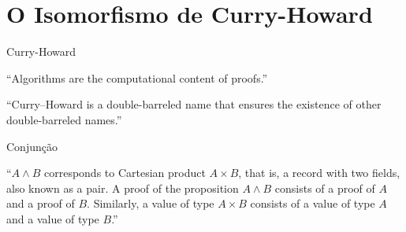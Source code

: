 \documentclass{beamer}
\begin{document}
\section{O Isomorfismo de Curry-Howard}

\begin{frame}{Curry-Howard}

\begin{exampleblock}{}
\justifying
  {\large ``Algorithms are the computational content of proofs.''}
  \vskip5mm
  \hspace*{}
\end{exampleblock}

\begin{exampleblock}{}
\justifying
  {\large ``Curry–Howard is a double-barreled name that ensures the existence of other double-barreled names.''}
  \vskip5mm
  \hspace*{}
\end{exampleblock}

\end{frame}


\begin{frame}{Conjunção}

“$A \land B$ corresponds to Cartesian product $A \times B$,
that is, a record with two fields, also known as a
pair. A proof of the proposition $A \land B$ consists of a
proof of $A$ and a proof of $B$. Similarly, a value of
type $A \times B$ consists of a value of type $A$ and a
value of type $B$.”

\end{frame}

\end{document}
